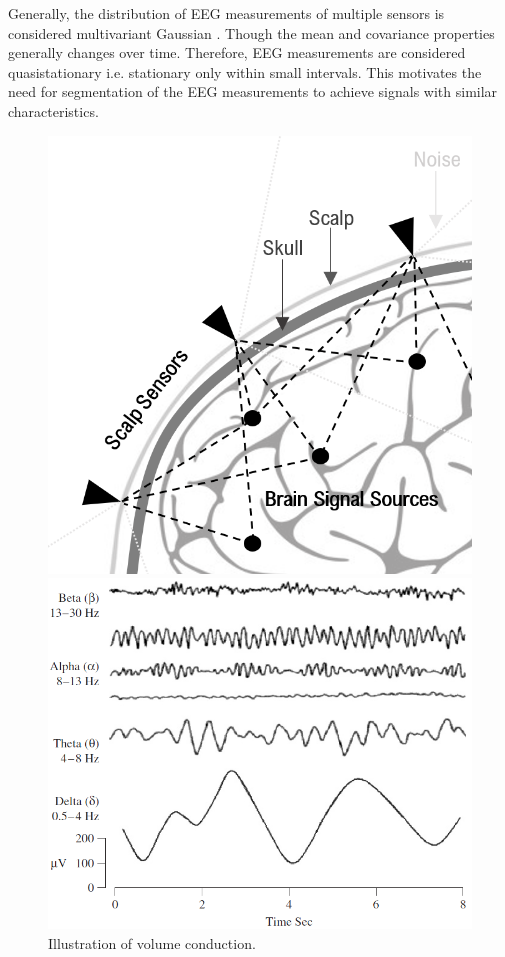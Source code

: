 Generally, the distribution of EEG measurements of multiple sensors is considered multivariant Gaussian \cite[p. 50]{EEGsignalprocessing}. Though the mean and covariance properties generally changes over time. Therefore, EEG measurements are considered quasistationary i.e. stationary only within small intervals. This motivates the need for segmentation of the EEG measurements to achieve signals with similar characteristics. 

\begin{figure}[H]
    \begin{minipage}[t]{.45\textwidth}
        \centering
        \includegraphics[width=\textwidth]{figures/EEG/volumeconduction.png}
        \caption{Illustration of volume conduction.}\label{fig:volumeconduction}
    \end{minipage} 
    \hfill
    \begin{minipage}[t]{.45\textwidth}
        \centering
        \includegraphics[width=\textwidth]{figures/EEG/EEG_example.png}

\end{minipage}
\end{figure}

